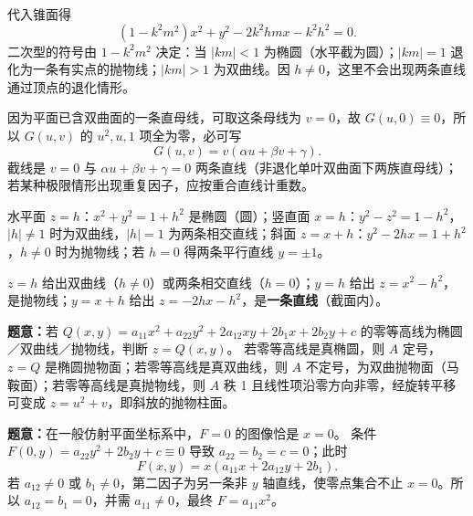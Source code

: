 代入锥面得
\[
(1-k^2m^2)x^2+y^2-2k^2hmx-k^2h^2=0.
\]
二次型的符号由 $1-k^2m^2$ 决定：当 $|km|<1$ 为椭圆（水平截为圆）；$|km|=1$ 退化为一条有实点的抛物线；$|km|>1$ 为双曲线。因 $h\ne0$，这里不会出现两条直线通过顶点的退化情形。

因为平面已含双曲面的一条直母线，可取这条母线为 $v=0$，故 $G(u,0)\equiv0$，所以 $G(u,v)$ 的 $u^2,u,1$ 项全为零，必可写
\[G(u,v)=v(\alpha u+\beta v+\gamma).
\]
截线是 $v=0$ 与 $\alpha u+\beta v+\gamma=0$ 两条直线（非退化单叶双曲面下两族直母线）；若某种极限情形出现重复因子，应按重合直线计重数。

水平面 $z=h$：$x^2+y^2=1+h^2$ 是椭圆（圆）；竖直面 $x=h$：$y^2-z^2=1-h^2$，$|h|\neq1$ 时为双曲线，$|h|=1$ 为两条相交直线；斜面 $z=x+h$：$y^2-2hx=1+h^2$，$h\ne0$ 时为抛物线；若 $h=0$ 得两条平行直线 $y=\pm1$。

$z=h$ 给出双曲线（$h\ne0$）或两条相交直线（$h=0$）；$y=h$ 给出 $z=x^2-h^2$，是抛物线；$y=x+h$ 给出 $z=-2hx-h^2$，是\textbf{一条直线}（截面内）。

\textbf{题意：}若 $Q(x,y)=a_{11}x^2+a_{22}y^2+2a_{12}xy+2b_1x+2b_2y+c$ 的零等高线为椭圆／双曲线／抛物线，判断 $z=Q(x,y)$。
若零等高线是真椭圆，则 $A$ 定号，$z=Q$ 是椭圆抛物面；若零等高线是真双曲线，则 $A$ 不定号，为双曲抛物面（马鞍面）；若零等高线是真抛物线，则 $A$ 秩 1 且线性项沿零方向非零，经旋转平移可变成 $z=u^2+v$，即斜放的抛物柱面。

\textbf{题意：}在一般仿射平面坐标系中，$F=0$ 的图像恰是 $x=0$。
条件 $F(0,y)=a_{22}y^2+2b_2y+c\equiv0$ 导致 $a_{22}=b_2=c=0$；此时
\[F(x,y)=x(a_{11}x+2a_{12}y+2b_1).
\]
若 $a_{12}\ne0$ 或 $b_1\ne0$，第二因子为另一条非 $y$ 轴直线，使零点集合不止 $x=0$。所以 $a_{12}=b_1=0$，并需 $a_{11}\ne0$，最终 $F=a_{11}x^2$。

